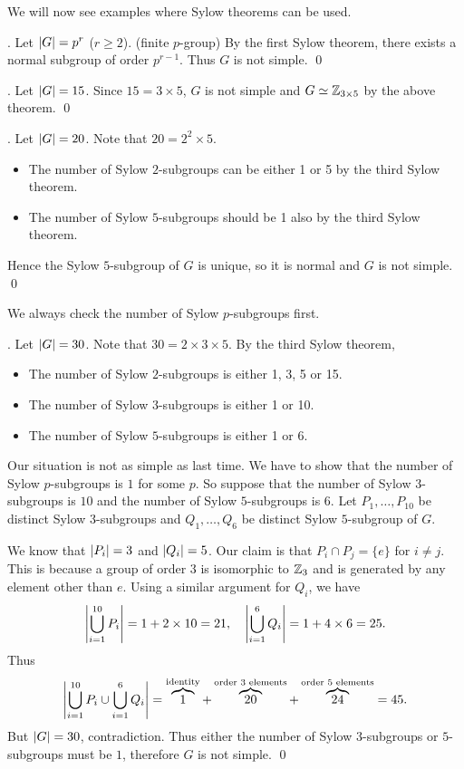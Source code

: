 \medskip

We will now see examples where Sylow theorems can be used.

\ex. Let \(\left| G \right| = p^r\) (\(r \geq 2\)). (finite \(p\)-group) By the first Sylow theorem, there exists a normal subgroup of order \(p^{r-1}\). Thus \(G\) is not simple. \qed

\ex. Let \(\left| G \right| = 15\). Since \(15 = 3 \times 5\), \(G\) is not simple and \(G \simeq \mathbb{Z}_{3\times 5}\) by the above theorem. \qed

\ex. Let \(\left| G \right| = 20\). Note that \(20 = 2^2 \times 5\).
\begin{itemize}
    \item The number of Sylow \(2\)-subgroups can be either 1 or 5 by the third Sylow theorem.
    \item The number of Sylow \(5\)-subgroups should be 1 also by the third Sylow theorem.
\end{itemize}
Hence the Sylow \(5\)-subgroup of \(G\) is unique, so it is normal and \(G\) is not simple. \qed

We always check the number of Sylow \(p\)-subgroups first.

\ex. Let \(\left| G \right| = 30\). Note that \(30 = 2 \times 3 \times 5\). By the third Sylow theorem,
\begin{itemize}
    \item The number of Sylow \(2\)-subgroups is either 1, 3, 5 or 15.
    \item The number of Sylow \(3\)-subgroups is either 1 or 10.
    \item The number of Sylow \(5\)-subgroups is either 1 or 6.
\end{itemize}
Our situation is not as simple as last time. We have to show that the number of Sylow \(p\)-subgroups is \(1\) for some \(p\). So suppose that the number of Sylow \(3\)-subgroups is \(10\) and the number of Sylow \(5\)-subgroups is \(6\). Let \(P_1, \dots, P_{10}\) be distinct Sylow \(3\)-subgroups and \(Q_1, \dots, Q_6\) be distinct Sylow \(5\)-subgroup of \(G\).

We know that \(\left| P_i \right| = 3\) and \(\left| Q_i \right| = 5\). Our claim is that \(P_i \cap P_j = \{e\}\) for \(i \neq j\). This is because a group of order \(3\) is isomorphic to \(\mathbb{Z}_3\) and is generated by any element other than \(e\). Using a similar argument for \(Q_i\), we have
\[
    \left| \bigcup_{i=1}^{10} P_i \right| = 1 + 2 \times 10 = 21, \quad \left| \bigcup_{i=1}^6 Q_i \right| = 1 + 4 \times 6 = 25.
\]
Thus
\[
    \left| \bigcup_{i=1}^{10} P_i \cup \bigcup_{i=1}^6 Q_i \right| = \overbrace{1}^{\text{identity}} + \overbrace{20}^{\text{order 3 elements}} + \overbrace{24}^{\text{order 5 elements}} = 45.
\]
But \(\left| G \right| = 30\), contradiction. Thus either the number of Sylow \(3\)-subgroups or \(5\)-subgroups must be \(1\), therefore \(G\) is not simple. \qed

